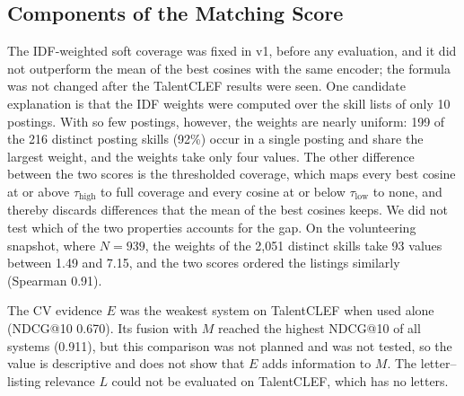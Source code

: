 \documentclass[CHICAGO]{USG}
\begin{document}
\subsection{Components of the Matching Score}
\label{sec:disc-components}
The IDF-weighted soft coverage was fixed in v1, before any evaluation, and it did not outperform the mean of the best cosines with the same encoder; the formula was not changed after the TalentCLEF results were seen. %
One candidate explanation is that the IDF weights were computed over the skill lists of only 10 postings. With so few postings, however, the weights are nearly uniform: 199 of the 216 distinct posting skills (92\%) occur in a single posting and share the largest weight, and the weights take only four values. The other difference between the two scores is the thresholded coverage, which maps every best cosine at or above $\tau_{\mathrm{high}}$ to full coverage and every cosine at or below $\tau_{\mathrm{low}}$ to none, and thereby discards differences that the mean of the best cosines keeps. We did not test which of the two properties accounts for the gap. %
On the volunteering snapshot, where $N=939$, the weights of the 2{,}051 distinct skills take 93 values between 1.49 and 7.15, and the two scores ordered the listings similarly (Spearman 0.91). %

The CV evidence $E$ was the weakest system on TalentCLEF when used alone (NDCG@10 0.670). Its fusion with $M$ reached the highest NDCG@10 of all systems (0.911), but this comparison was not planned and was not tested, so the value is descriptive and does not show that $E$ adds information to $M$. %
The letter--listing relevance $L$ could not be evaluated on TalentCLEF, which has no letters.
\end{document}
